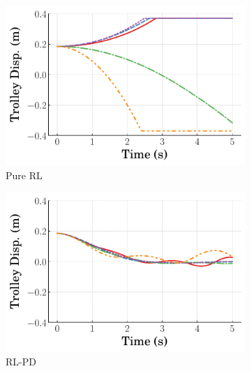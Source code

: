 \begin{figure}[tb]
    \centering
    \begin{subfigure}[b]{0.49\textwidth}
        \centering
        \includegraphics[width=\textwidth]{figures/figures_RL_model_based_control/time_responses_crane/dpcrane_pure_RL/Cart_displacement_0p185_init_0_steps.pdf}
        \caption{Pure RL}
        \label{subfig_chap2:dpcrane_trolley_resp_0steps_pure_RL}
    \end{subfigure}
    \hfill
    \begin{subfigure}[b]{0.49\textwidth}
	    \centering
	    \includegraphics[width=\textwidth]{figures/figures_RL_model_based_control/time_responses_crane/dpcrane_cont_gain_sched/Cart_displacement_0p185_init_0_steps.pdf}
	    \caption{RL-PD}
	    \label{subfig_chap2:dpcrane_trolley_resp_0steps_gain_sched}
    \end{subfigure}
    \hfill
    \begin{subfigure}[b]{0.49\textwidth}

\end{subfigure}
\end{figure}

